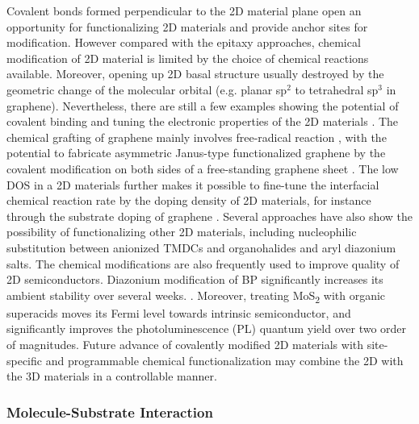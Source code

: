 Covalent bonds formed perpendicular to the 2D material plane open an
opportunity for functionalizing 2D materials and provide anchor sites
for modification. However compared with the epitaxy approaches,
chemical modification of 2D material is limited by the choice of
chemical reactions available. Moreover, opening up 2D basal structure
usually destroyed by the geometric change of the molecular orbital
(e.g. planar sp\(^{\text{2}}\) to tetrahedral sp\(^{\text{3}}\) in
graphene). Nevertheless, there are still a few examples showing the
potential of covalent binding and tuning the electronic properties of
the 2D materials
\cite{Georgakilas_2012_noncoval_gr_rev,Lee_2011_tempo_gr,Zhang_2013_janus_gr,Voiry_2014_cov_TMDC_phase,Vishnoi_2016_ar_mos2_covalent,Liu_2011_rev_chem_dope_gr,Wang_2012_ar_gr_react_rate}.
%
The chemical grafting of graphene mainly involves free-radical
reaction
\cite{Lee_2011_tempo_gr,Choi_2010_aminotempo_gr,Zhang_2013_janus_gr,Wang_2012_ar_gr_react_rate,Kumar_2014_2D_MOF_gr},
%
with the potential to fabricate asymmetric Janus-type functionalized
graphene by the covalent modification on both sides of a free-standing
graphene sheet \cite{Zhang_2013_janus_gr}. The low DOS in a 2D
materials further makes it possible to fine-tune the interfacial
chemical reaction rate by the doping density of 2D materials, for
instance through the substrate doping of graphene
\cite{Wang_2012_ar_gr_react_rate}. Several approaches have also show
the possibility of functionalizing other 2D materials, including
nucleophilic substitution between anionized TMDCs and organohalides
\cite{Vishnoi_2016_ar_mos2_covalent} and aryl diazonium
salts.  The chemical modifications are also
frequently used to improve quality of 2D semiconductors.
%
Diazonium modification of BP significantly increases its ambient
stability over several weeks. . Moreover, treating MoS\textsubscript{2} with organic
super\-acids moves its Fermi level towards intrinsic semiconductor,
and significantly improves the photo\-luminescence (PL) quantum yield over two order of magnitudes. 
%
Future advance of covalently
modified 2D materials with site-specific and programmable chemical
functionalization may combine the 2D with the 3D materials in a
controllable manner.

\subsubsection{Molecule-Substrate Interaction}
\label{sec:intro-mol-subst}

